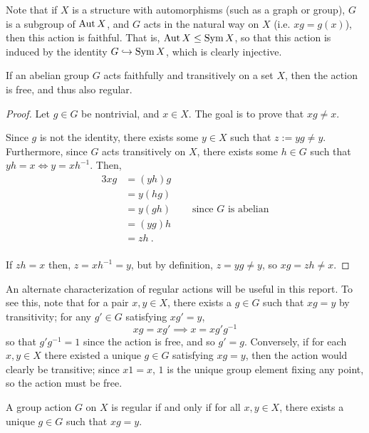 \documentclass{report}
\begin{document}
    Note that if $X$ is a structure with automorphisms
    (such as a graph or group), $G$ is a subgroup of $\operatorname{Aut} X$,
    and $G$ acts in the natural way on $X$ (i.e. $xg = g(x)$),
    then this action is faithful.
    That is, $\operatorname{Aut} X \leq \operatorname{Sym} X$,
    so that this action is induced by the identity $G \hookrightarrow \operatorname{Sym} X$,
    which is clearly injective.

    \begin{lem}\label{faithful-transitive-abelian}
      If an abelian group $G$ acts faithfully and transitively on a set $X$,
      then the action is free, and thus also regular. \cite[Section 4.1,
      Exercise 3]{dummit-foote}
    \end{lem}

    \begin{proof}
      Let $g \in G$ be nontrivial, and $x \in X$.
      The goal is to prove that $xg \neq x$.

      Since $g$ is not the identity,
      there exists some $y \in X$ such that $z := yg \neq y$.
      Furthermore, since $G$ acts transitively on $X$,
      there exists some $h \in G$ such that $yh = x \iff y = xh^{-1}$.
      Then,
      \begin{alignat*}{3}
        xg &= (yh) g &\\
        &= y (hg) &\\
        &= y (gh) \quad&\text{ since $G$ is abelian}\\
        &= (yg) h &\\
        &= zh \ .&\\
      \end{alignat*}

      If $zh = x$ then, $z = xh^{-1} = y$,
      but by definition, $z = yg \neq y$,
      so $xg = zh \neq x$.
    \end{proof}

    An alternate characterization of regular actions will be useful in this
    report.  To see this, note that for a pair $x, y \in X$, there exists a $g
    \in G$ such that $xg = y$ by transitivity; for any $g' \in G$ satisfying
    $xg' = y$,
    $$
      xg = xg' \implies x = x g'g^{-1}
    $$
    so that $g'g^{-1} = 1$ since the action is free, and so $g' = g$.
    Conversely, if for each $x, y \in X$ there existed a unique $g \in G$
    satisfying $xg = y$, then the action would clearly be transitive; since $x 1
    = x$, $1$ is the unique group element fixing any point, so the action must
    be free.

    \begin{lem}\label{regular-unique}
      A group action $G$ on $X$ is regular if and only if
      for all $x, y \in X$, there exists a unique $g \in G$
      such that $xg = y$.
    \end{lem}
\end{document}
